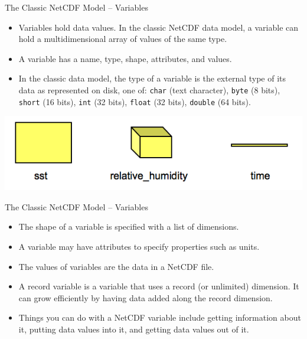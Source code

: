 \documentclass[compress,11pt,xcolor=svgnames,aspectratio=169]{beamer}
\begin{document}
\begin{frame}[fragile]{The Classic NetCDF Model -- Variables}

\begin{itemize}
\setlength\itemsep{0.3cm}

  \item Variables hold data values. In the classic NetCDF data model, a variable can hold a multidimensional array of values of the same type.

  \item A variable has a name, type, shape, attributes, and values.

  \item In the classic data model, the type of a variable is the external type of its data as represented on disk, one of: \texttt{char} (text character), \texttt{byte} (8 bits), \texttt{short} (16 bits), \texttt{int} (32 bits), \texttt{float} (32 bits), \texttt{double} (64 bits).

\end{itemize}

\begin{center}
\includegraphics[scale=0.5]{fig/ncvar}
\end{center}

\nocite{netcdf}

\end{frame}

\begin{frame}[fragile]{The Classic NetCDF Model -- Variables}

\begin{itemize}
\setlength\itemsep{0.4cm}

  \item The shape of a variable is specified with a list of dimensions.

  \item A variable may have attributes to specify properties such as units.

  \item The values of variables are the data in a NetCDF file.

  \item A record variable is a variable that uses a record (or unlimited) dimension. It can grow efficiently by having data added along the record dimension.

  \item Things you can do with a NetCDF variable include getting information about it, putting data values into it, and getting data values out of it.

\end{itemize}

\nocite{netcdf}

\end{frame}
\end{document}
